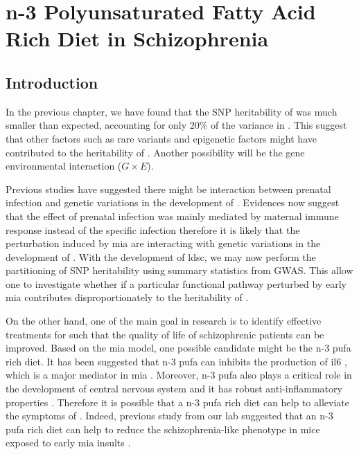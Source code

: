 \chapter{n-3 Polyunsaturated Fatty Acid Rich Diet in Schizophrenia}
\label{omegaProject}
\section{Introduction}
In the previous chapter, we have found that the \gls{SNP} heritability of  was much smaller than expected, accounting for only 20\% of the variance in .
This suggest that other factors such as rare variants and epigenetic factors might have contributed to the heritability of .
Another possibility will be the gene environmental interaction ($G\times E$).

Previous studies have suggested there might be interaction between prenatal infection and genetic variations in the development of  \citep{Tienari2004,Clarke2009}.
Evidences now suggest that the effect of prenatal infection was mainly mediated by maternal immune response instead of the specific infection \citep{Brown2010} therefore it is likely that the perturbation induced by \gls{mia} are interacting with genetic variations in the development of .
With the development of \gls{ldsc}, we may now perform the partitioning of \gls{SNP} heritability using summary statistics from \gls{GWAS}. 
This allow one to investigate whether if a particular functional pathway perturbed by early \gls{mia} contributes disproportionately to the heritability of .

On the other hand, one of the main goal in  research is to identify effective treatments for  such that the quality of life of schizophrenic patients can be improved. 
Based on the \gls{mia} model, one possible candidate might be the n-3 \gls{pufa} rich diet. 
It has been suggested that n-3 \gls{pufa} can inhibits the production of \gls{il6} \citep{Trebble2003}, which is a major mediator in \gls{mia} \citep{Smith2007}.
Moreover, n-3 \gls{pufa} also plays a critical role in the development of central nervous system \citep{Clandinin1999} and it has robust anti-inflammatory properties \citep{Trebble2003}.
Therefore it is possible that a n-3 \gls{pufa} rich diet can help to alleviate the symptoms of .
Indeed, previous study from our lab suggested that an n-3 \gls{pufa} rich diet can help to reduce the schizophrenia-like phenotype in mice exposed to early \gls{mia} insults \citep{Li2015}.

